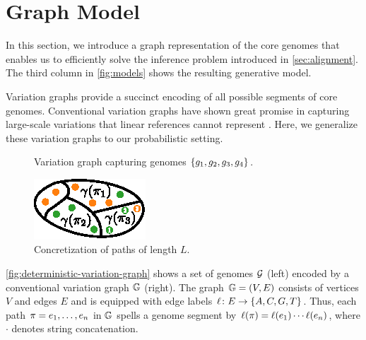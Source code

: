 \section{Graph Model} \label{sec:graph-model}
In this section, we introduce a graph representation of the core genomes that
enables us to efficiently solve the inference problem introduced in \cref{sec:alignment}.
The third column in \cref{fig:models} shows the resulting generative model.

Variation graphs provide a succinct encoding of all possible segments of core genomes.
Conventional variation graphs have shown great promise in capturing large-scale variations that linear references cannot represent \cite{VGtool,paten2017genome,garrison2018variation}.
Here, we generalize these variation graphs to our probabilistic setting.

\begin{figure}
	\begin{minipage}{0.7\linewidth}
		
		\caption{Variation graph capturing genomes $\{g_1, g_2, g_3, g_4\}$.}
		\label{fig:deterministic-variation-graph}
	\end{minipage}\hspace{0.04\linewidth}
	\begin{minipage}{0.25\linewidth}
		\centering
		\includegraphics[width=0.8\linewidth]{figures/partition}
		\caption{Concretization of paths of length $L$.}
		\label{fig:partition}
	\end{minipage}
\end{figure}

\cref{fig:deterministic-variation-graph} shows a set of genomes $\mathcal{G}$ (left) encoded by a conventional variation graph $\mathbb{G}$ (right).
The graph $\mathbb{G}=(V,E)$ consists of vertices $V$ and edges $E$ and is equipped with edge labels $\ell \colon E \to \{A,C,G,T\}$.
Thus, each path $\pi=e_1,\dots, e_n$ in $\mathbb{G}$ spells a genome segment by $\ell(\pi)=\ell(e_1) \cdots \ell(e_n)$, where $\cdot$ denotes string concatenation.

